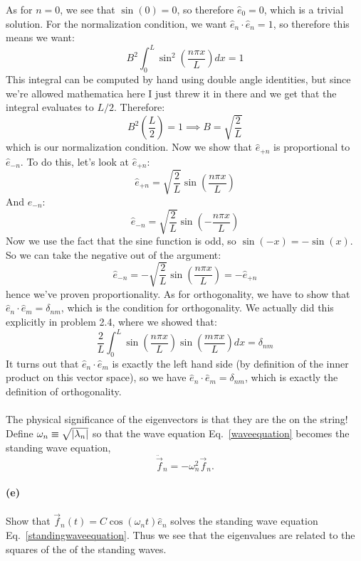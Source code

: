 \documentclass{article}
\begin{document}
\begin{solution}
	As for $n = 0$, we see that $\sin(0) = 0$, so therefore $\hat{e}_0 = 0$, which is a trivial solution. For
	the normalization condition, we want $\hat{e}_n \cdot \hat{e}_n = 1$, so therefore this means we want:
	\[
	B^2 \int_0^L \sin^2\left(\frac{n \pi x}{L}\right) dx = 1
	\] 
	This integral can be computed by hand using double angle identities, but since we're allowed mathematica here
	I just threw it in there and we get that the integral evaluates to $L / 2$. Therefore:
	\[
	B^2 \left(\frac{L}{2}\right) = 1 \implies B = \sqrt{\frac{2}{L}} 
	\] 
	which is our normalization condition. Now we show that $\hat{e}_{+n}$ is proportional to $\hat{e}_{-n}$. To
	do this, let's look at $\hat{e}_{+n}$:
	\[
		\hat{e}_{+n} = \sqrt{\frac{2}{L}}  \sin(\frac{n \pi x}{L})
	\] 
	And $\hat{e}_{-n}$:
	\[
		\hat{e}_{-n} = \sqrt{\frac{2}{L}}  \sin(-\frac{n \pi x}{L})
	\] 
	Now we use the fact that the sine function is odd, so $\sin(-x) = -\sin(x)$. So we can take the negative
	out of the argument:
	\[
		\hat{e}_{-n} = -\sqrt{\frac{2}{L}}  \sin(\frac{n \pi x}{L}) = -\hat{e}_{+n}
	\] 
	hence we've proven proportionality. As for orthogonality, we have to show that $\hat{e}_n \cdot \hat{e}_m = 
	\delta_{nm}$, which is the condition for orthogonality. We actually did this explicitly in problem 2.4, where
	we showed that:
	\[
	\frac{2}{L}\int_0^L \sin\left(\frac{n \pi x}{L}\right)
	\sin\left( \frac{m \pi x}{L}\right) dx = \delta_{nm}
	\] 
	It turns out that $\hat{e}_n \cdot \hat{e}_m$ is exactly the left hand side (by definition of the inner 
	product on this vector space), so we have $\hat{e}_n \cdot \hat{e}_m
	= \delta_{nm}$, which is exactly the definition of orthogonality. 
\end{solution}

\phline
\paragraph{}
The physical significance of the eigenvectors is that they are the  on the string!  Define $\omega_{n} \equiv \sqrt{\left|{\lambda_{n}}\right|}$ so that
the wave equation Eq.~\ref{waveequation} becomes the standing wave equation,
	\begin{equation}
		\ddot{\vec{f}}_{n} = -\omega^{2}_{n}\vec{f}_{n}.
	\label{standingwaveequation}
	\end{equation}


\paragraph{(e)}
Show that $\vec{f}_{n}(t) = C \cos(\omega_{n} t)\hat{e}_{n}$ solves the standing wave equation Eq.~\ref{standingwaveequation}.  
Thus we see that the eigenvalues are related to the squares of the  of the standing waves.
\end{document}
